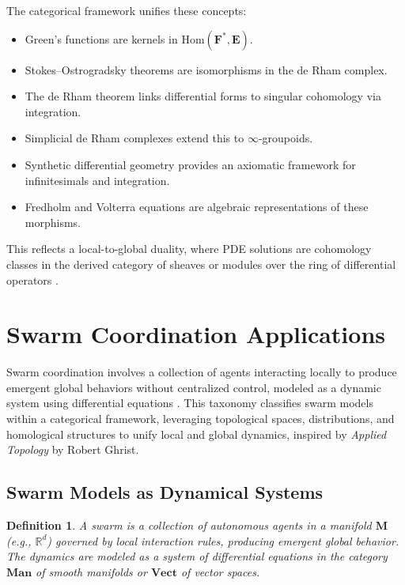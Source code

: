 \documentclass{article}
\theoremstyle{plain}
\newtheorem{definition}{Definition}[section]
\newcommand{\cat}[1]{\mathbf{#1}}
\newcommand{\Hom}{\mathrm{Hom}}
\begin{document}
The categorical framework unifies these concepts:
\begin{itemize}
    \item Green's functions are kernels in \(\Hom(\cat{F}^*, \cat{E})\).
    \item Stokes--Ostrogradsky theorems are isomorphisms in the de Rham complex.
    \item The de Rham theorem links differential forms to singular cohomology via integration.
    \item Simplicial de Rham complexes extend this to \(\infty\)-groupoids.
    \item Synthetic differential geometry provides an axiomatic framework for infinitesimals and integration.
    \item Fredholm and Volterra equations are algebraic representations of these morphisms.
\end{itemize}

This reflects a local-to-global duality, where PDE solutions are cohomology
classes in the derived category of sheaves or modules over the ring of differential
operators \cite{nLab_de_Rham_theorem, nLab_synthetic_diff_geom}.

\section{Swarm Coordination Applications}

Swarm coordination involves a collection of agents interacting locally to produce emergent global behaviors without centralized control, modeled as a dynamic system using differential equations \cite{nLab_dynamical_systems}. This taxonomy classifies swarm models within a categorical framework, leveraging topological spaces, distributions, and homological structures to unify local and global dynamics, inspired by \emph{Applied Topology} by Robert Ghrist.

\subsection{Swarm Models as Dynamical Systems}

\begin{definition}
A \emph{swarm} is a collection of autonomous agents in a manifold \(\cat{M}\) (e.g., \(\mathbb{R}^d\))
governed by local interaction rules, producing emergent global behavior. The dynamics are modeled
as a system of differential equations in the category \(\cat{Man}\) of smooth manifolds or \(\cat{Vect}\) of vector spaces.
\end{definition}
\end{document}
